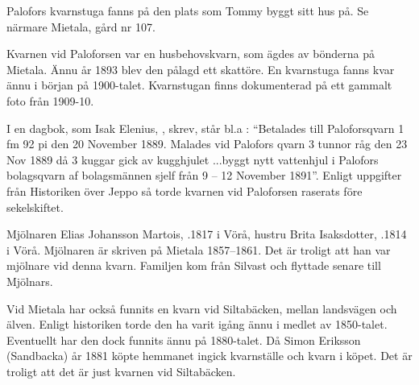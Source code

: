 Palofors kvarnstuga fanns på den plats som Tommy byggt sitt hus på. Se närmare Mietala, gård nr 107.


%

\jhnooccupant{}


Kvarnen vid Paloforsen var en husbehovskvarn, som ägdes av bönderna på 	Mietala. Ännu år 1893 blev den pålagd ett skattöre. En kvarnstuga fanns kvar ännu i början på 1900-talet. Kvarnstugan finns dokumenterad på ett gammalt foto från 1909-10.

I en dagbok, som Isak Elenius, , skrev,  står bl.a : ``Betalades till Paloforsqvarn 1 fm 92 pi den 20 November 1889. Malades vid Palofors qvarn 3 tunnor råg den 23  Nov 1889 då 3 kuggar gick av kugghjulet 	...byggt nytt vattenhjul i Palofors bolagsqvarn af bolagsmännen sjelf från 9 – 12 November 1891''. Enligt uppgifter från Historiken över Jeppo så torde kvarnen vid Paloforsen raserats före sekelskiftet.


%
Mjölnaren Elias Johansson Martois, .1817 i Vörå, hustru Brita Isaksdotter, .1814 i Vörå. Mjölnaren är skriven på Mietala 1857–1861. Det är troligt att han var mjölnare vid denna kvarn. Familjen kom från Silvast och flyttade senare till Mjölnars.
\begin{jhchildren}
  \item {}
  \item {}
  \item {}
  \item {}
  \item {}
  \item {}
  \item {}
  \item {}
\end{jhchildren}



Vid Mietala har också funnits en kvarn vid Siltabäcken, mellan landsvägen och älven. Enligt historiken torde den ha varit igång ännu i medlet av 1850-talet. Eventuellt har den dock funnits ännu på 1880-talet. Då Simon Eriksson (Sandbacka) år 1881 köpte hemmanet ingick kvarnställe och kvarn  i köpet. Det är troligt att det är just kvarnen vid Siltabäcken.



